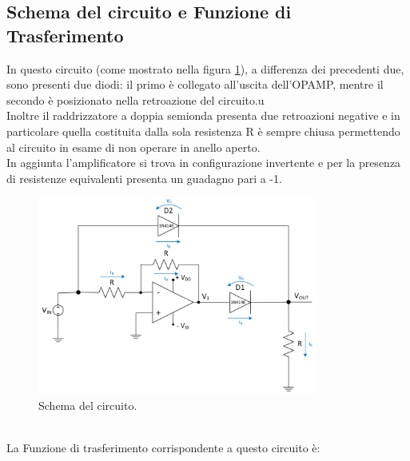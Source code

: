 \documentclass{report}
\begin{document}
\subsection{Schema del circuito e Funzione di Trasferimento}
In questo circuito (come mostrato nella figura \ref{figura:schema3}), a differenza dei precedenti due, sono presenti due diodi: il primo è collegato all'uscita dell'OPAMP, mentre il secondo è posizionato nella retroazione del circuito.u
\\Inoltre il raddrizzatore a doppia semionda presenta due retroazioni negative e in particolare quella costituita dalla sola resistenza R è sempre chiusa permettendo al circuito in esame di non operare in anello aperto.
\\In aggiunta l'amplificatore si trova in configurazione invertente e per la presenza di resistenze equivalenti presenta un guadagno pari a -1.
\begin{figure}[h]
	\centering
	\includegraphics[height=6.5cm]{immagini/schema3}
	\caption{Schema del circuito.}
	\label{figura:schema3}
\end{figure}
\\La Funzione di trasferimento corrispondente a questo circuito è:
\end{document}
